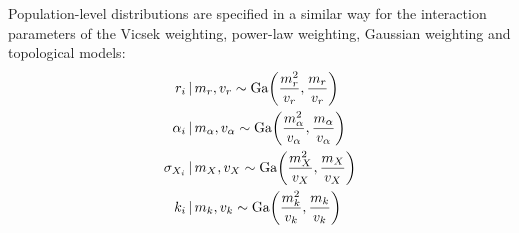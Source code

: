 Population-level distributions are specified in a similar way for the interaction
parameters of the Vicsek weighting, power-law weighting, Gaussian weighting and
topological models:
\begin{align}
    r_i &\,|\, m_r, v_r  \sim \textrm{Ga}\bigg(\frac{m_r^2}{v_r}, \frac{m_r}{v_r}\bigg)\\
    \alpha_i &\,|\, m_{\alpha}, v_{\alpha}  \sim
        \textrm{Ga}\bigg(\frac{m_{\alpha}^2}{v_{\alpha}}, \frac{m_{\alpha}}{v_{\alpha}}\bigg)\\
    \sigma_{X_i} &\,|\, m_X, v_X  \sim \textrm{Ga}\bigg(\frac{m_X^2}{v_X}, \frac{m_X}{v_X}\bigg)\\
    k_i &\,|\, m_k, v_k  \sim \textrm{Ga}\bigg(\frac{m_k^2}{v_k}, \frac{m_k}{v_k}\bigg)
\end{align}
